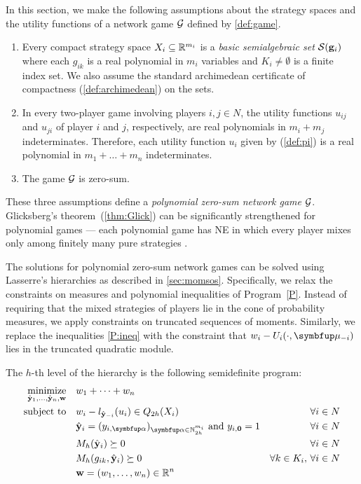 In this section, we make the following assumptions about the strategy spaces and the utility functions of a network game $\mathcal{G}$ defined by \eqref{def:game}.
\begin{enumerate}
    \item Every compact strategy space $X_i\subseteq \mathbb{R}^{m_i}$ is a \emph{basic semialgebraic set} $\mathcal{S}(\mathbf{g}_i)$ where each $g_{ik}$ is a real polynomial in $m_i$ variables and $K_i\neq\emptyset$ is a finite index set. We also assume the standard archimedean certificate of compactness  (\cref{def:archimedean}) on the sets.
    \item In every two-player game involving players $i,j\in N$, the utility functions $u_{ij}$ and $u_{ji}$ of player $i$ and $j$, respectively, are real polynomials in $m_i+m_j$ indeterminates.  Therefore, each utility function $u_i$ given by (\ref{def:pi}) is a real polynomial in $m_1+\dots + m_n$ indeterminates.
    \item The game $\mathcal{G}$ is zero-sum.
\end{enumerate}
These three assumptions define a \emph{polynomial zero-sum network game} $\mathcal{G}$. Glicksberg's theorem~(\ref{thm:Glick}) can be significantly strengthened for polynomial games --- each polynomial game has NE in which every player mixes only among finitely many pure strategies \cite{DresherKarlinShapley50,stein.ozdaglar.ea:separable}.

The solutions for polynomial zero-sum network games can be solved using Lasserre's hierarchies as described in \cref{sec:momsos}. Specifically, we relax the constraints on measures and polynomial inequalities of Program~\ref{P}. Instead of requiring that the mixed strategies of players lie in the cone of probability measures, we apply constraints on truncated sequences of moments. Similarly, we replace the inequalities \eqref{P:ineq} with the constraint that $w_i - U_i(\cdot, \bmu_{-i})$ lies in the truncated quadratic module.

The $h$-th level of the hierarchy is the following semidefinite program:
\begin{equation}
    \begin{aligned}
        \minimize_{\hat{\by}_1,\dots,\hat{\by}_n,\bw}\quad& w_1+\dots +w_n \\
        \text{\normalfont subject to}\quad
        & w_i - l_{\hat{\by}_{-i}}(u_i) \in Q_{2h}(X_i) &\forall i \in N\\
        & \hat{\by}_i=(y_{i,\balpha})_{\balpha\in\N^{m_i}_{2h}} \text{ and $y_{i,\mathbf{0}}=1$} &\forall i \in N\\
        & M_h(\hat{\by}_i)\succeq 0 &\forall i \in N\\
        & M_h(g_{ik}, \hat{\by}_i)\succeq 0 & \forall k\in K_i,\, \forall i \in N\\
        & \bw=(w_1,\dots,w_n) \in\R^n \\
    \end{aligned}
    \label{momsdp}
\end{equation}

